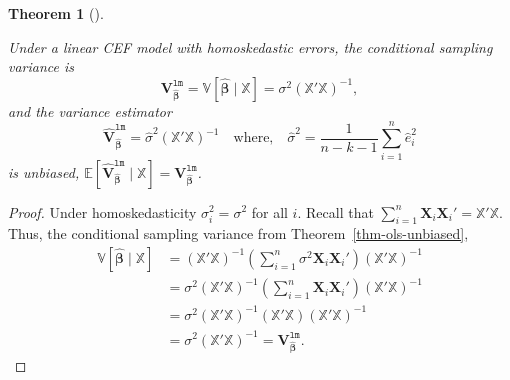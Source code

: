 \documentclass[
  letterpaper,
  DIV=11,
  numbers=noendperiod]{scrreprt}
\newcommand{\mb}{\symbf}
\newcommand{\E}{\mathbb{E}}
\newcommand{\V}{\mathbb{V}}
\newcommand{\X}{\mb{X}}
\newcommand{\Xmat}{\mathbb{X}}
\newcommand{\bhat}{\widehat{\mb{\beta}}}
\theoremstyle{plain}
\newtheorem{theorem}{Theorem}[chapter]
\theoremstyle{definition}
\theoremstyle{definition}
\theoremstyle{remark}
\begin{document}
\begin{theorem}[]\protect\hypertarget{thm-homoskedasticity}{}\label{thm-homoskedasticity}

Under a linear CEF model with homoskedastic errors, the conditional
sampling variance is \[
\mb{V}^{\texttt{lm}}_{\bhat} = \V[\bhat \mid \Xmat] = \sigma^2 \left( \Xmat'\Xmat \right)^{-1},
\] and the variance estimator \[
\widehat{\mb{V}}^{\texttt{lm}}_{\bhat} = \widehat{\sigma}^2 \left( \Xmat'\Xmat \right)^{-1} \quad\text{where,}\quad \widehat{\sigma}^2 = \frac{1}{n - k - 1} \sum_{i=1}^n \widehat{e}_i^2
\] is unbiased,
\(\E[\widehat{\mb{V}}^{\texttt{lm}}_{\bhat} \mid \Xmat] = \mb{V}^{\texttt{lm}}_{\bhat}\).

\end{theorem}

\begin{proof}

Under homoskedasticity \(\sigma^2_i = \sigma^2\) for all \(i\). Recall
that \(\sum_{i=1}^n \X_i\X_i' = \Xmat'\Xmat\). Thus, the conditional
sampling variance from Theorem~\ref{thm-ols-unbiased}, \[ 
\begin{aligned}
\V[\bhat \mid \Xmat] &= \left( \Xmat'\Xmat \right)^{-1}\left( \sum_{i=1}^n \sigma^2 \X_i\X_i' \right) \left( \Xmat'\Xmat \right)^{-1} \\ &= \sigma^2\left( \Xmat'\Xmat \right)^{-1}\left( \sum_{i=1}^n \X_i\X_i' \right) \left( \Xmat'\Xmat \right)^{-1} \\&= \sigma^2\left( \Xmat'\Xmat \right)^{-1}\left( \Xmat'\Xmat \right) \left( \Xmat'\Xmat \right)^{-1} \\&= \sigma^2\left( \Xmat'\Xmat \right)^{-1} = \mb{V}^{\texttt{lm}}_{\bhat}.
\end{aligned}
\]


\end{proof}
\end{document}

